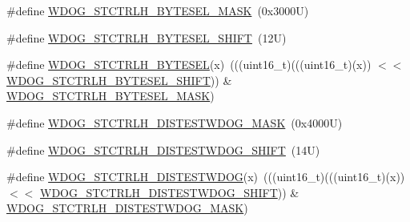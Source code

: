 \begin{DoxyCompactItemize}
\item 
\#define \mbox{\hyperlink{group___w_d_o_g___register___masks_ga20d3012eda5935f73ec4a9e24720fdc2}{W\+D\+O\+G\+\_\+\+S\+T\+C\+T\+R\+L\+H\+\_\+\+B\+Y\+T\+E\+S\+E\+L\+\_\+\+M\+A\+SK}}~(0x3000\+U)
\item 
\#define \mbox{\hyperlink{group___w_d_o_g___register___masks_ga0f73c2f0d56eac9caafc8a0337f95cc8}{W\+D\+O\+G\+\_\+\+S\+T\+C\+T\+R\+L\+H\+\_\+\+B\+Y\+T\+E\+S\+E\+L\+\_\+\+S\+H\+I\+FT}}~(12\+U)
\item 
\#define \mbox{\hyperlink{group___w_d_o_g___register___masks_ga13958aa7d857b661998e304c5b3b4ea7}{W\+D\+O\+G\+\_\+\+S\+T\+C\+T\+R\+L\+H\+\_\+\+B\+Y\+T\+E\+S\+EL}}(x)~(((uint16\+\_\+t)(((uint16\+\_\+t)(x)) $<$$<$ \mbox{\hyperlink{group___w_d_o_g___register___masks_ga0f73c2f0d56eac9caafc8a0337f95cc8}{W\+D\+O\+G\+\_\+\+S\+T\+C\+T\+R\+L\+H\+\_\+\+B\+Y\+T\+E\+S\+E\+L\+\_\+\+S\+H\+I\+FT}})) \& \mbox{\hyperlink{group___w_d_o_g___register___masks_ga20d3012eda5935f73ec4a9e24720fdc2}{W\+D\+O\+G\+\_\+\+S\+T\+C\+T\+R\+L\+H\+\_\+\+B\+Y\+T\+E\+S\+E\+L\+\_\+\+M\+A\+SK}})
\item 
\#define \mbox{\hyperlink{group___w_d_o_g___register___masks_gadc235bcbd7644d445d3ca5cb682cdc57}{W\+D\+O\+G\+\_\+\+S\+T\+C\+T\+R\+L\+H\+\_\+\+D\+I\+S\+T\+E\+S\+T\+W\+D\+O\+G\+\_\+\+M\+A\+SK}}~(0x4000\+U)
\item 
\#define \mbox{\hyperlink{group___w_d_o_g___register___masks_gabc176648bbc119e959823d20c38d3ece}{W\+D\+O\+G\+\_\+\+S\+T\+C\+T\+R\+L\+H\+\_\+\+D\+I\+S\+T\+E\+S\+T\+W\+D\+O\+G\+\_\+\+S\+H\+I\+FT}}~(14\+U)
\item 
\#define \mbox{\hyperlink{group___w_d_o_g___register___masks_ga2a15bc2d029a46c255e400c878caf95d}{W\+D\+O\+G\+\_\+\+S\+T\+C\+T\+R\+L\+H\+\_\+\+D\+I\+S\+T\+E\+S\+T\+W\+D\+OG}}(x)~(((uint16\+\_\+t)(((uint16\+\_\+t)(x)) $<$$<$ \mbox{\hyperlink{group___w_d_o_g___register___masks_gabc176648bbc119e959823d20c38d3ece}{W\+D\+O\+G\+\_\+\+S\+T\+C\+T\+R\+L\+H\+\_\+\+D\+I\+S\+T\+E\+S\+T\+W\+D\+O\+G\+\_\+\+S\+H\+I\+FT}})) \& \mbox{\hyperlink{group___w_d_o_g___register___masks_gadc235bcbd7644d445d3ca5cb682cdc57}{W\+D\+O\+G\+\_\+\+S\+T\+C\+T\+R\+L\+H\+\_\+\+D\+I\+S\+T\+E\+S\+T\+W\+D\+O\+G\+\_\+\+M\+A\+SK}})
\end{DoxyCompactItemize}
